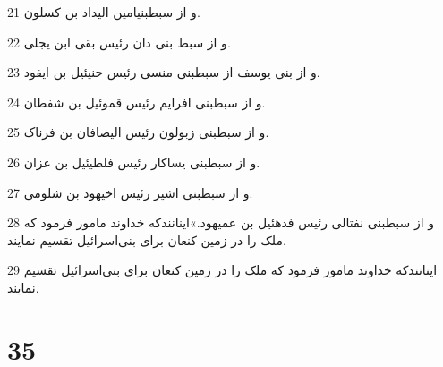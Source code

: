 \par 21 و از سبطبنیامین الیداد بن کسلون.
\par 22 و از سبط بنی دان رئیس بقی ابن یجلی.
\par 23 و از بنی یوسف از سبطبنی منسی رئیس حنیئیل بن ایفود.
\par 24 و از سبطبنی افرایم رئیس قموئیل بن شفطان.
\par 25 و از سبطبنی زبولون رئیس الیصافان بن فرناک.
\par 26 و از سبطبنی یساکار رئیس فلطیئیل بن عزان.
\par 27 و از سبطبنی اشیر رئیس اخیهود بن شلومی.
\par 28 و از سبطبنی نفتالی رئیس فدهئیل بن عمیهود.»اینانندکه خداوند مامور فرمود که ملک را در زمین کنعان برای بنی‌اسرائیل تقسیم نمایند.
\par 29 اینانندکه خداوند مامور فرمود که ملک را در زمین کنعان برای بنی‌اسرائیل تقسیم نمایند.
 
\chapter{35}

